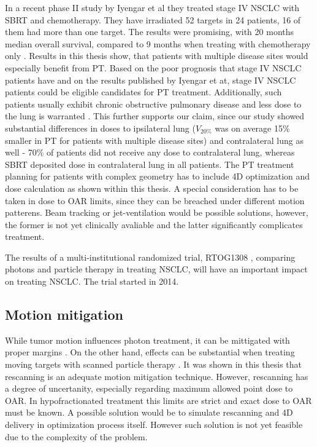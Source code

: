 \documentclass[type=dr, dr=rernat, accentcolor=tud7b,colorbacktitle, bigchapter, openright, twoside, 12pt ]{tudthesis}
\begin{document}
In a recent phase II study by Iyengar et al \cite{Iyengar2014} they treated stage IV NSCLC with SBRT and chemotherapy. 
They have irradiated 52 targets in 24 patients, 16 of them had more than one target. The results were promising, with 20 months median overall survival, 
compared to 9 months when treating with chemotherapy only \cite{Tsao2008}. Results in this thesis show, that patients with multiple disease sites 
would especially benefit from PT. Based on the poor prognosis that stage IV NSCLC patients have and on the results published by Iyengar et at,
stage IV NSCLC patients could be eligible candidates for PT treatment. Additionally, such patients usually exhibit chronic obstructive pulmonary disease and 
less dose to the lung is warranted \cite{Westover2012}. This further supports our claim, since our study showed substantial differences in 
doses to ipsilateral lung ($V_{20\%}$ was on average 15\% smaller in PT for patients with multiple disease sites) and 
contralateral lung as well - 70\% of patients did not receive any dose to contralateral lung, whereas SBRT deposited dose in contralateral lung in all patients.
The PT treatment planning for patients with complex geometry has to include 4D optimization and dose calculation as shown within this thesis. 
A special consideration has to be taken in dose to OAR limits, since they can be breached under different motion patterens.
Beam tracking \cite{Bert2007} or jet-ventilation \cite{Santiago2013} would be possible solutions, however, the former is not yet clinically avaliable and the latter 
significantly complicates treatment.

The results of a multi-institutional randomized trial, RTOG1308 \cite{RTOG1308}, comparing photons and particle therapy in treating NSCLC,
will have an important impact on treating NSCLC. The trial started in 2014.

\subsection{Motion mitigation}

While tumor motion influences photon treatment, it can be mittigated with proper margins \cite{Zou2014}. 
On the other hand, effects can be substantial when treating moving targets with scanned particle therapy \cite{Bert2008}.
It was shown in this thesis that rescanning is an adequate motion mitigation technique. However, rescanning has a degree of uncertanity, 
especially regarding maximum allowed point dose to OAR.
In hypofractionated treatment this limits are strict and exact dose to OAR must be known. 
A possible solution would be to simulate rescanning and 4D delivery in optimization process itself. 
However such solution is not yet feasible due to the complexity of the problem.
\end{document}
